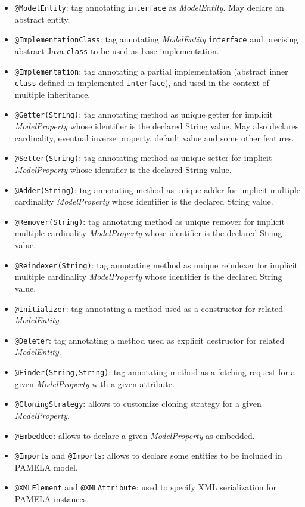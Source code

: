 \begin{itemize}
    \item \texttt{@ModelEntity}: tag annotating \texttt{interface} as \emph{ModelEntity}. May declare an abstract entity.
    \item \texttt{@ImplementationClass}: tag annotating \emph{ModelEntity} \texttt{interface} and precising abstract Java \texttt{class} to be used as base implementation.
    \item \texttt{@Implementation}: tag annotating a partial implementation (abstract inner \texttt{class} defined in implemented \texttt{interface}), and used in the context of multiple inheritance.
    \item \texttt{@Getter(String)}: tag annotating method as unique getter for implicit \emph{ModelProperty} whose identifier is the declared String value. May also declares cardinality, eventual inverse property, default value and some other features.
    \item \texttt{@Setter(String)}: tag annotating method as unique setter for implicit \emph{ModelProperty} whose identifier is the declared String value.
    \item \texttt{@Adder(String)}: tag annotating method as unique adder for implicit multiple cardinality \emph{ModelProperty} whose identifier is the declared String value.
    \item \texttt{@Remover(String)}: tag annotating method as unique remover for implicit multiple cardinality \emph{ModelProperty} whose identifier is the declared String value.
    \item \texttt{@Reindexer(String)}: tag annotating method as unique reindexer for implicit multiple cardinality \emph{ModelProperty} whose identifier is the declared String value.
    \item \texttt{@Initializer}: tag annotating a method used as a constructor for related \emph{ModelEntity}.
   \item \texttt{@Deleter}: tag annotating a method used as explicit destructor for related \emph{ModelEntity}.
    \item \texttt{@Finder(String,String)}: tag annotating method as a fetching request for a given \emph{ModelProperty} with a given attribute.
    \item \texttt{@CloningStrategy}: allows to customize cloning strategy for a given \emph{ModelProperty}.
    \item \texttt{@Embedded}: allows to declare a given \emph{ModelProperty} as
      embedded. %
    \item \texttt{@Imports} and \texttt{@Imports}: allows to declare some entities to be included in PAMELA model.
    \item \texttt{@XMLElement} and \texttt{@XMLAttribute}: used to specify XML serialization for PAMELA instances.
    
\end{itemize}

